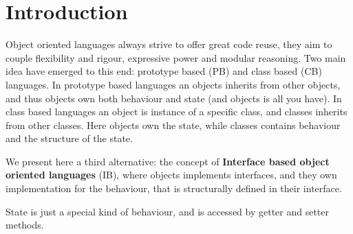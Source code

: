 \section{Introduction}\label{sec:intro}

Object oriented languages always strive to offer great code reuse,
they aim to couple flexibility and rigour, expressive power and modular reasoning.
Two main idea have emerged to this end: prototype based (PB) and class based (CB) languages.
In prototype based languages an objects inherits from other objects,
and thus objects own both behaviour and state (and objects is all you have).
In class based languages an object is instance of a specific class, and classes inherits from other classes.
Here objects own the state, while classes contains behaviour and the structure of the state.

We present here a third alternative: the concept of
 \textbf{Interface based object oriented languages} (IB), where 
  objects implements interfaces, and they own implementation for the behaviour,
that is structurally defined in their interface.
  
  State is just a special kind of behaviour, and is accessed by getter and setter methods.
  
